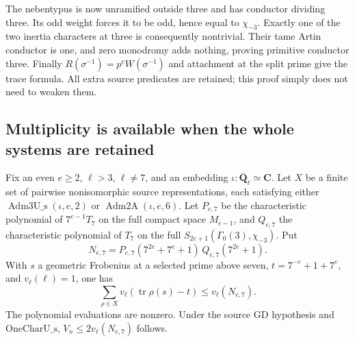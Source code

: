 The nebentypus is now unramified outside three and has conductor
dividing three. Its odd weight forces it to be odd, hence equal
to $\chi_{-3}$. Exactly one of the two inertia characters at
three is consequently nontrivial. Their tame Artin conductor
is one, and zero monodromy adds nothing, proving primitive
conductor three. Finally
$R(\sigma^{-1})=p^eW(\sigma^{-1})$ and attachment at the split
prime give the trace formula. All extra source predicates are
retained; this proof simply does not need to weaken them.

\subsection{Multiplicity is available when the whole systems are retained}

\begin{lemma}
Fix an even $e\geq2$, $\ell>3$, $\ell\ne7$, and an embedding
$\iota:\overline{\mathbf Q}_\ell\simeq\mathbf C$.
Let $X$ be a finite set of pairwise nonisomorphic source
representations, each satisfying either
$\operatorname{Adm3U\_s}(\iota,e,2)$ or
$\operatorname{Adm2A}(\iota,e,6)$.
Let $P_{e,7}$ be the characteristic polynomial of
$7^{e-1}T_7$ on the full compact space $M_{e-1}$, and
$Q_{e,7}$ the characteristic polynomial of $T_7$ on the full
$S_{2e+1}(\Gamma_0(3),\chi_{-3})$.
Put
\[
 N_{e,7}=P_{e,7}(7^{2e}+7^e+1)\,Q_{e,7}(7^{2e}+1).
\]
With $s$ a geometric Frobenius at a selected prime above seven,
$t=7^{-e}+1+7^e$, and $v_\ell(\ell)=1$, one has
\[
 \sum_{\rho\in X}v_\ell(\operatorname{tr}\rho(s)-t)
                       \leq v_\ell(N_{e,7}).           \tag{KT-M.1}
\]
The polynomial evaluations are nonzero. Under the source
$\mathrm{GD}$ hypothesis and $\mathrm{OneCharU\_s}$,
$V_n\leq2v_\ell(N_{e,7})$ follows.
\end{lemma}
